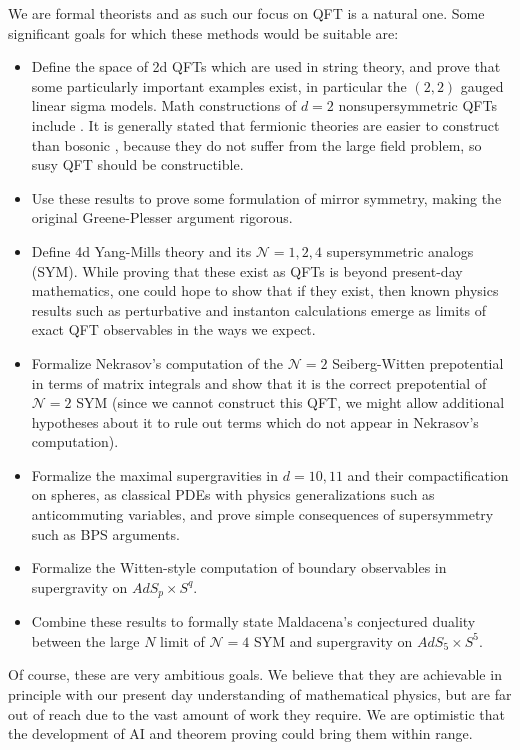 \documentclass{article}
\newcommand{\1}{\mathbbm{1}}
\theoremstyle{plain}
\theoremstyle{definition}
\numberwithin{equation}{section}
\newcommand{\cN}{\mathcal N}
\begin{document}
We are formal theorists and as such our focus on QFT is a natural one.  Some significant goals 
for which these methods would be suitable are:
\begin{itemize}
    \item Define the space of 2d QFTs which are used in string theory, and prove that some particularly important examples exist, in particular the $(2,2)$ gauged linear sigma models.  Math constructions of $d=2$ nonsupersymmetric QFTs include \cite{}.  It is generally stated that fermionic theories are easier to construct than bosonic \cite{},
    because they do not suffer from the large field problem, so susy QFT should be constructible.
    \item Use these results to prove some formulation of mirror symmetry, making the original Greene-Plesser argument rigorous.
    \item Define 4d Yang-Mills theory and its $\cN=1,2,4$ supersymmetric analogs (SYM).  While proving that these exist
    as QFTs is beyond present-day mathematics, one could hope to show that if they exist, then known physics results such as perturbative and instanton calculations emerge as limits of exact QFT observables in the ways we expect.
    \item Formalize Nekrasov's computation of the $\cN=2$ Seiberg-Witten prepotential in terms of matrix integrals
    and show that it is the correct prepotential of $\cN=2$ SYM (since we cannot construct this QFT, we might allow additional hypotheses about it to rule out terms which do not appear in Nekrasov's computation).
    \item Formalize the maximal supergravities in $d=10,11$ and their compactification on spheres, as classical PDEs with physics generalizations such as anticommuting variables, and prove simple consequences of supersymmetry such as BPS arguments.
    \item Formalize the Witten-style computation of boundary observables in supergravity on $AdS_p\times S^q$.
    \item Combine these results to formally state Maldacena's conjectured duality between the large $N$
    limit of $\cN=4$ SYM and supergravity on  $AdS_5\times S^5$.
\end{itemize}
Of course, these are very ambitious goals. We believe that they are achievable in principle with our present day understanding of mathematical physics, but are far out of reach due to the vast amount of work they require.
We are optimistic that the development of AI and theorem proving could bring them within range.
\end{document}
